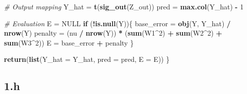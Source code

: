 \documentclass[12pt,halfline,a4paper,]{ouparticle}
\newenvironment{Shaded}{\begin{snugshade}}{\end{snugshade}}
\newcommand{\AttributeTok}[1]{\textcolor[rgb]{0.13,0.29,0.53}{#1}}
\newcommand{\CommentTok}[1]{\textcolor[rgb]{0.56,0.35,0.01}{\textit{#1}}}
\newcommand{\ConstantTok}[1]{\textcolor[rgb]{0.56,0.35,0.01}{#1}}
\newcommand{\ControlFlowTok}[1]{\textcolor[rgb]{0.13,0.29,0.53}{\textbf{#1}}}
\newcommand{\DecValTok}[1]{\textcolor[rgb]{0.00,0.00,0.81}{#1}}
\newcommand{\FunctionTok}[1]{\textcolor[rgb]{0.13,0.29,0.53}{\textbf{#1}}}
\newcommand{\NormalTok}[1]{#1}
\newcommand{\OtherTok}[1]{\textcolor[rgb]{0.56,0.35,0.01}{#1}}
\newcommand{\SpecialCharTok}[1]{\textcolor[rgb]{0.81,0.36,0.00}{\textbf{#1}}}
\begin{document}
\begin{Shaded}
\begin{Highlighting}[]
  \CommentTok{\# Output mapping}
\NormalTok{  Y\_hat }\OtherTok{=} \FunctionTok{t}\NormalTok{(}\FunctionTok{sig\_out}\NormalTok{(Z\_out))}
\NormalTok{  pred }\OtherTok{=} \FunctionTok{max.col}\NormalTok{(Y\_hat) }\SpecialCharTok{{-}} \DecValTok{1}
  
  \CommentTok{\# Evaluation}
\NormalTok{  E }\OtherTok{=} \ConstantTok{NULL}
  \ControlFlowTok{if}\NormalTok{ (}\SpecialCharTok{!}\FunctionTok{is.null}\NormalTok{(Y))\{}
\NormalTok{    base\_error }\OtherTok{=} \FunctionTok{obj}\NormalTok{(Y, Y\_hat) }\SpecialCharTok{/} \FunctionTok{nrow}\NormalTok{(Y)}
\NormalTok{    penalty }\OtherTok{=}\NormalTok{ (nu }\SpecialCharTok{/} \FunctionTok{nrow}\NormalTok{(Y)) }\SpecialCharTok{*}\NormalTok{ (}\FunctionTok{sum}\NormalTok{(W1}\SpecialCharTok{\^{}}\DecValTok{2}\NormalTok{) }\SpecialCharTok{+} \FunctionTok{sum}\NormalTok{(W2}\SpecialCharTok{\^{}}\DecValTok{2}\NormalTok{) }\SpecialCharTok{+} \FunctionTok{sum}\NormalTok{(W3}\SpecialCharTok{\^{}}\DecValTok{2}\NormalTok{))}
\NormalTok{    E }\OtherTok{=}\NormalTok{ base\_error }\SpecialCharTok{+}\NormalTok{ penalty}
\NormalTok{  \}}
  
  \FunctionTok{return}\NormalTok{(}\FunctionTok{list}\NormalTok{(}\AttributeTok{Y\_hat =}\NormalTok{ Y\_hat, }\AttributeTok{pred =}\NormalTok{ pred, }\AttributeTok{E =}\NormalTok{ E))}
\NormalTok{\}}
\end{Highlighting}
\end{Shaded}

\subsection*{1.h}\label{h}
\end{document}
